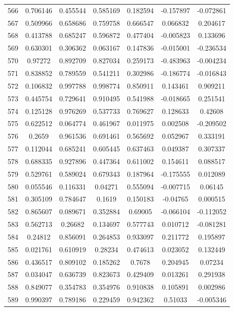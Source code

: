\begin{table}
\begin{tabular}{c|c|c|c|c|c|c}
566 & 0.706146 & 0.455544 & 0.585169 & 0.182594 & -0.157897 & -0.072861\\
567 & 0.509966 & 0.658686 & 0.759758 & 0.666547 & 0.066832 & 0.204617\\
568 & 0.413788 & 0.685247 & 0.596872 & 0.477404 & -0.005823 & 0.133696\\
569 & 0.630301 & 0.306362 & 0.063167 & 0.147836 & -0.015001 & -0.236534\\
570 & 0.97272 & 0.892709 & 0.827034 & 0.259173 & -0.483963 & -0.004234\\
571 & 0.838852 & 0.789559 & 0.541211 & 0.302986 & -0.186774 & -0.016843\\
572 & 0.106832 & 0.997788 & 0.998774 & 0.850911 & 0.143461 & 0.909211\\
573 & 0.445754 & 0.729641 & 0.910495 & 0.541988 & -0.018665 & 0.251541\\
574 & 0.125128 & 0.976269 & 0.537733 & 0.769627 & 0.128633 & 0.42608\\
575 & 0.622512 & 0.064774 & 0.461967 & 0.011975 & 0.002508 & -0.209502\\
576 & 0.2659 & 0.961536 & 0.691461 & 0.565692 & 0.052967 & 0.333191\\
577 & 0.112044 & 0.685241 & 0.605445 & 0.637463 & 0.049387 & 0.307337\\
578 & 0.688335 & 0.927896 & 0.447364 & 0.611002 & 0.154611 & 0.088517\\
579 & 0.529761 & 0.589024 & 0.679343 & 0.187964 & -0.175555 & 0.012089\\
580 & 0.055546 & 0.116331 & 0.04271 & 0.555094 & -0.007715 & 0.06145\\
581 & 0.305109 & 0.784647 & 0.1619 & 0.150183 & -0.04765 & 0.000515\\
582 & 0.865607 & 0.089671 & 0.352884 & 0.69005 & -0.066104 & -0.112052\\
583 & 0.562713 & 0.26682 & 0.134697 & 0.577743 & 0.010712 & -0.081281\\
584 & 0.24812 & 0.856091 & 0.264853 & 0.933097 & 0.211772 & 0.195897\\
585 & 0.021761 & 0.610919 & 0.28234 & 0.474613 & 0.023052 & 0.132449\\
586 & 0.436517 & 0.809102 & 0.185262 & 0.7678 & 0.204945 & 0.07234\\
587 & 0.034047 & 0.636739 & 0.823673 & 0.429409 & 0.013261 & 0.291938\\
588 & 0.849077 & 0.354783 & 0.354976 & 0.910838 & 0.105891 & 0.002986\\
589 & 0.990397 & 0.789186 & 0.229459 & 0.942362 & 0.51033 & -0.005346\\

\end{tabular}
\end{table}
